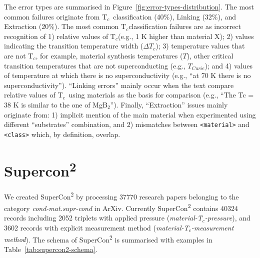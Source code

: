 \documentclass[]{interact}
\theoremstyle{plain}%
\theoremstyle{definition}
\theoremstyle{remark}
\newcommand{\tc}{T$_{c}$}
\begin{document}
The error types are summarised in Figure~\ref{fig:error-types-distribution}. The most common failures  originate from \tc~classification (40\%), Linking (32\%), and Extraction (20\%).
The most common \tc classification failures are as incorrect recognition of 1) relative values of \tc (e.g., 1 K higher than material X); 2) values indicating the transition temperature width ($\Delta T_{c}$); 3) temperature values that are not \tc, for example, material synthesis temperatures ($T$), other critical transition temperatures that are not superconducting (e.g., $T_{Curie}$); and 4) values of temperature at which there is no superconductivity (e.g., ``at 70 K there is no superconductivity'').
``Linking errors'' mainly occur when the text compare relative values of \tc~using materials as the basis for comparison (e.g., ``The Tc = 38 K is similar to the one of MgB$_{2}$'').
Finally, ``Extraction'' issues mainly originate from: 1) implicit mention of the main material when experimented using different ``substrates'' combination, and 2) mismatches between \texttt{<material>} and \texttt{<class>} which, by definition, overlap.



\section{Supercon\textsuperscript{2}}

We created SuperCon\textsuperscript{2} by processing 37770 research papers belonging to the category \textit{cond-mat.supr-cond} in ArXiv.
Currently SuperCon\textsuperscript{2} contains 40324 records including 2052 triplets with applied pressure (\textit{material-\tc-pressure}), and 3602 records with explicit measurement method (\textit{material-\tc-measurement method}).
The schema of SuperCon\textsuperscript{2} is summarised with examples in Table~\ref{tab:supercon2-schema}.
\end{document}
